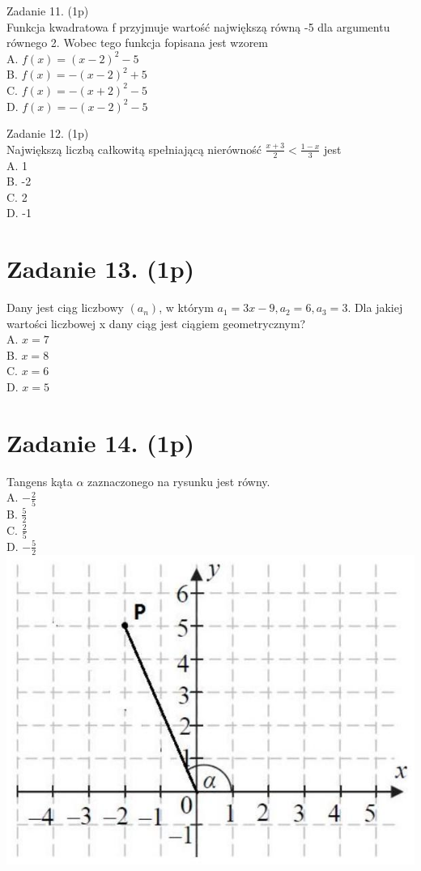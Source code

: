 \documentclass[10pt]{article}
\begin{document}
Zadanie 11. (1p)\\
Funkcja kwadratowa f przyjmuje wartość największą równą -5 dla argumentu równego 2. Wobec tego funkcja fopisana jest wzorem\\
A. \(f(x)=(x-2)^{2}-5\)\\
B. \(f(x)=-(x-2)^{2}+5\)\\
C. \(f(x)=-(x+2)^{2}-5\)\\
D. \(f(x)=-(x-2)^{2}-5\)

Zadanie 12. (1p)\\
Największą liczbą całkowitą spełniającą nierówność \(\frac{x+3}{2}<\frac{1-x}{3}\) jest\\
A. 1\\
B. -2\\
C. 2\\
D. -1

\section*{Zadanie 13. (1p)}
Dany jest ciąg liczbowy \(\left(a_{n}\right)\), w którym \(a_{1}=3 x-9, a_{2}=6, a_{3}=3\). Dla jakiej wartości liczbowej x dany ciąg jest ciągiem geometrycznym?\\
A. \(x=7\)\\
B. \(x=8\)\\
C. \(x=6\)\\
D. \(x=5\)

\section*{Zadanie 14. (1p)}
Tangens kąta \(\alpha\) zaznaczonego na rysunku jest równy.\\
A. \(-\frac{2}{5}\)\\
B. \(\frac{5}{2}\)\\
C. \(\frac{2}{5}\)\\
D. \(-\frac{5}{2}\)\\
\includegraphics[max width=\textwidth, center]{2024_11_21_d45b0573b36a3462565cg-04}
\end{document}
